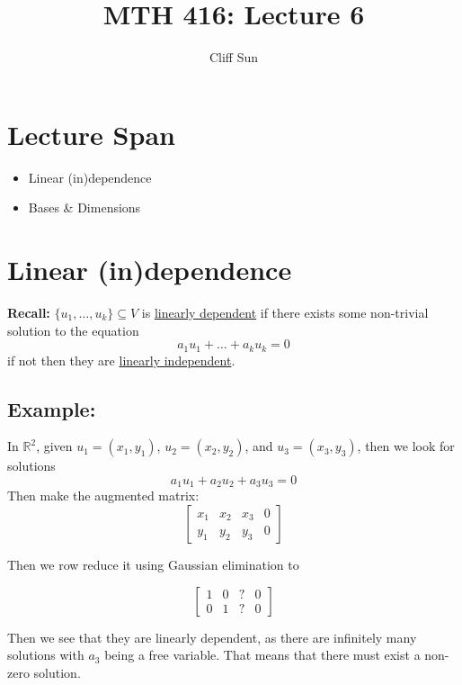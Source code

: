 \documentclass{article}
\title{MTH 416: Lecture 6}
\author{Cliff Sun}
\newtheorem{one minute paper}[theorem]{One Minute Paper}
\begin{document}
\maketitle

\section*{Lecture Span}
\begin{itemize}
    \item Linear (in)dependence
    \item Bases \& Dimensions
\end{itemize}

\section*{Linear (in)dependence}


\textbf{Recall:} $\{u_1, \dots, u_k\} \subseteq V$ is \underline{linearly dependent} if there exists some non-trivial solution to the equation
\begin{equation}
    a_1u_1 + \dots + a_ku_k = 0
\end{equation}
if not then they are \underline{linearly independent}.

\subsection*{Example:}

In $\mathbb{R}^2$, given $u_1 = (x_1,y_1)$, $u_2 = (x_2, y_2)$, and $u_3 = (x_3, y_3)$, then we look for solutions
\begin{equation}
    a_1u_1 + a_2u_2 + a_3u_3 = 0
\end{equation}
Then make the augmented matrix:
\[
    \left[\begin{array}{ccc|c}
    x_1 & x_2 & x_3 & 0 \\
    y_1 & y_2 & y_3 & 0
\end{array}\right]\]

Then we row reduce it using Gaussian elimination to 

\[
    \left[\begin{array}{ccc|c}
    1 & 0 & ? & 0 \\
    0 & 1 & ? & 0
\end{array}\right]\]

Then we see that they are linearly dependent, as there are infinitely many solutions with $a_3$ being a free variable. That means that 
there must exist a non-zero solution.
\end{document}
